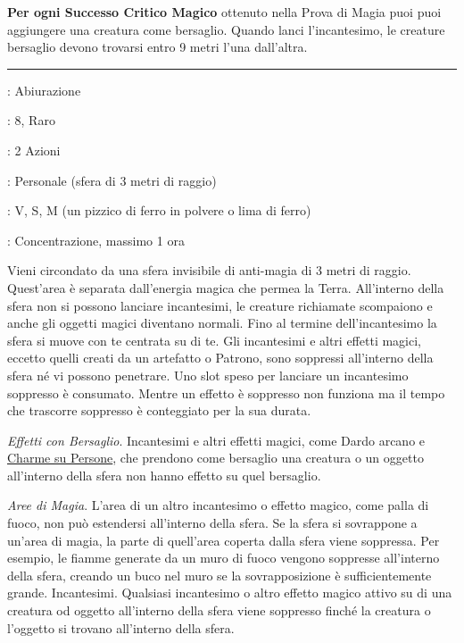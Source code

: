\begin{multicols}{2}
\textbf{Per ogni Successo Critico Magico} ottenuto nella Prova di Magia puoi puoi aggiungere una creatura come bersaglio. Quando lanci l'incantesimo, le creature bersaglio devono trovarsi entro 9 metri l'una dall'altra.

\smallskip\noindent\rule{\linewidth}{2pt} \hypertarget{Campo Anti-Magia}{}\medskip{}
\noindent
\begin{description}[noitemsep, topsep=0pt, parsep=0pt, partopsep=0pt, leftmargin=0cm, labelwidth=2.8cm]
	\item[\textbf{Lista di Magia}]: Abiurazione
	\item[\textbf{Livello}]: 8, Raro
	\item[\textbf{T. di Lancio}]: 2 Azioni
	\item[\textbf{Gittata}]: Personale (sfera di 3 metri di raggio)
	\item[\textbf{Componenti}]: V, S, M (un pizzico di ferro in polvere o lima di ferro)
	\item[\textbf{Durata}]: Concentrazione, massimo 1 ora
\end{description}

Vieni circondato da una sfera invisibile di anti-magia di 3 metri di raggio. Quest'area è separata dall'energia magica che permea la Terra. All'interno della sfera non si possono lanciare incantesimi, le creature richiamate scompaiono e anche gli oggetti magici diventano normali. Fino al termine dell'incantesimo la sfera si muove con te centrata su di te. Gli incantesimi e altri effetti magici, eccetto quelli creati da un artefatto o Patrono, sono soppressi all'interno della sfera né vi possono penetrare. Uno slot speso per lanciare un incantesimo soppresso è consumato. Mentre un effetto è soppresso non funziona ma il tempo che trascorre soppresso è conteggiato per la sua durata.

\medskip

\noindent\emph{Effetti con Bersaglio}. Incantesimi e altri effetti magici, come Dardo arcano e \hyperlink{Charme su Persone}{Charme su Persone}, che prendono come bersaglio una creatura o un oggetto all'interno della sfera non hanno effetto su quel bersaglio.

\emph{Aree di Magia}. L'area di un altro incantesimo o effetto magico, come palla di fuoco, non può estendersi all'interno della sfera. Se la sfera si sovrappone a un'area di magia, la parte di quell'area coperta dalla sfera viene soppressa. Per esempio, le fiamme generate da un muro di fuoco vengono soppresse all'interno della sfera, creando un buco nel muro se la sovrapposizione è sufficientemente grande. Incantesimi. Qualsiasi incantesimo o altro effetto magico attivo su di una creatura od oggetto all'interno della sfera viene soppresso finché la creatura o l'oggetto si trovano all'interno della sfera.


\end{multicols}
